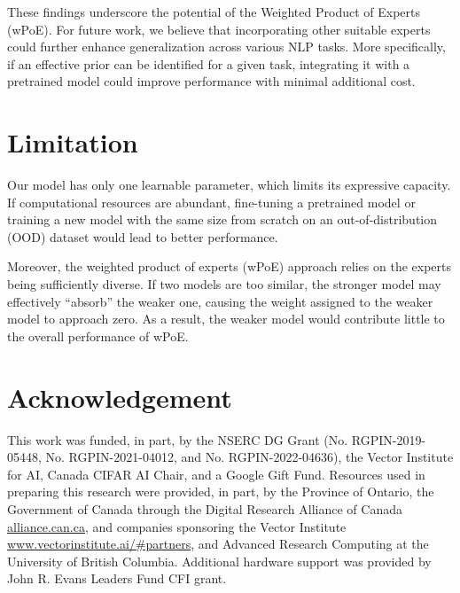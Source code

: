 \documentclass[11pt]{article}
\begin{document}
These findings underscore the potential of the Weighted Product of Experts (wPoE). For future work, we believe that incorporating other suitable experts could further enhance generalization across various NLP tasks.  
More specifically, if an effective prior can be identified for a given task, integrating it with a pretrained model could improve performance with minimal additional cost.

%
\newpage
\section{Limitation}
Our model has only one learnable parameter, which limits its expressive capacity. If computational resources are abundant, fine-tuning a pretrained model or training a new model with the same size from scratch on an out-of-distribution (OOD) dataset would lead to better performance.

Moreover, the weighted product of experts (wPoE) approach relies on the experts being sufficiently diverse. If two models are too similar, the stronger model may effectively ``absorb'' the weaker one, causing the weight assigned to the weaker model to approach zero. As a result, the weaker model would contribute little to the overall performance of wPoE.


\section*{Acknowledgement}

This work was funded, in part, by the NSERC DG Grant (No. RGPIN-2019-05448, No. RGPIN-2021-04012, and No. RGPIN-2022-04636), the Vector Institute for AI, Canada CIFAR AI Chair, and a Google Gift Fund. Resources used in preparing this research were provided, in part, by the Province of Ontario, the Government of Canada through the Digital Research Alliance of Canada \url{alliance.can.ca}, and companies sponsoring the Vector Institute \url{www.vectorinstitute.ai/#partners}, and Advanced Research Computing at the University of British Columbia. 
Additional hardware support was provided by John R. Evans Leaders Fund CFI grant.

\end{document}
